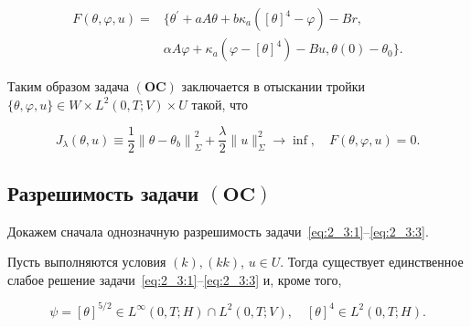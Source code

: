 \[
    \begin{aligned}
        F(\theta, \varphi, u)= & \{\theta^{\prime}+a A
        \theta+b \kappa_{a}\left([\theta]^{4}-\varphi\right)-B r, \\
        & \alpha A \varphi+\kappa_{a}\left(\varphi-[\theta]^{4}\right)-B u,
        \theta(0)-\theta_{0}\}.
    \end{aligned}
\]

Таким образом задача $(\mathbf{OC})$ заключается в отыскании тройки
$\{\theta, \varphi, u\} \in W \times L^{2}(0, T ; V) \times U$ такой, что

\[
    J_{\lambda}(\theta, u) \equiv \frac{1}{2}\left\|\theta-
    \theta_{b}\right\|_{\Sigma}^{2}+
    \frac{\lambda}{2}\|u\|_{\Sigma}^{2}
    \rightarrow \inf, \quad F(\theta, \varphi, u)=0.
\]

\subsection{Разрешимость задачи $(\mathbf{OC})$}
\label{subsec:ch2/sec3/subsec3}
Докажем сначала однозначную разрешимость
задачи~\eqref{eq:2_3:1}--\eqref{eq:2_3:3}.

\begin{lemma}
    \label{lm:2_3:1}
    Пусть выполняются условия $(k), (kk)$, $u \in U$.
    Тогда существует единственное слабое решение
    задачи~\eqref{eq:2_3:1}--\eqref{eq:2_3:3} и, кроме того,

    \[
        \psi=[\theta]^{5 / 2} \in L^{\infty}(0, T; H) \cap L^{2}(0, T ; V),
        \quad[\theta]^{4} \in L^{2}(0, T ; H).
    \]
\end{lemma}

